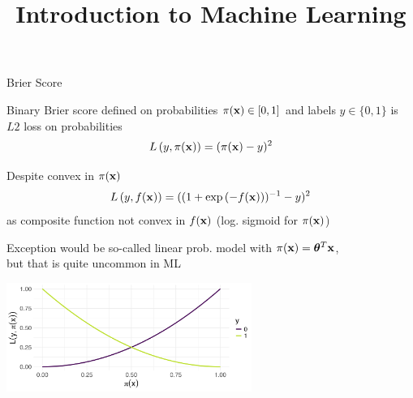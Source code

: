 \documentclass[11pt,compress,t,notes=noshow, xcolor=table]{beamer}
\title{Introduction to Machine Learning}
\begin{document}
    


\begin{vbframe}{Brier Score}

\begin{footnotesize}

\begin{itemizeM}
\item Binary Brier score defined on probabilities $\pi(\mathbf{x}) \in [0, 1]$ and labels $y \in \{0, 1\}$ is $L2$ loss on probabilities $$L\left(y, \pi(\mathbf{x})\right) = (\pi(\mathbf{x}) - y)^2$$
\item Despite convex in $\pi(\mathbf{x})$ $$L\left(y, f(\mathbf{x})\right)=((1+\exp{(-f(\mathbf{x}))})^{-1}-y)^2$$ as composite function not convex in $f(\mathbf{x})$ (log. sigmoid for $\pi(\mathbf{x})$)
\item Exception would be so-called linear prob. model with $\pi(\mathbf{x}) = \bm{\theta}^T \mathbf{x}$,\\
but that is quite uncommon in ML 
\end{itemizeM}

\begin{center}
\includegraphics[width = 0.6\textwidth]{figure/brier.png}
\end{center}

\end{footnotesize}


\end{vbframe}
\end{document}
